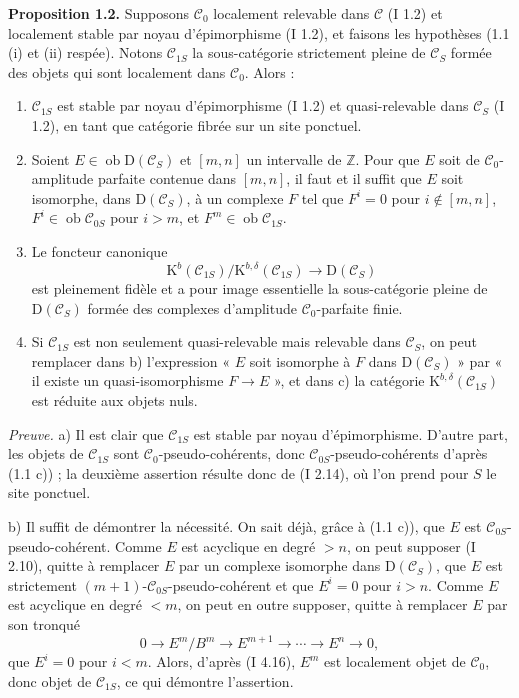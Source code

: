 \documentclass[11pt]{article}
\providecommand{\Ob}{\operatorname{ob}}
\begin{document}
\textbf{Proposition 1.2.} Supposons $\mathcal C_0$ localement relevable dans $\mathcal C$ (I 1.2) et localement stable par noyau d'épimorphisme (I 1.2), et faisons les hypothèses (1.1 (i) et (ii) respée). Notons $\mathcal C_{1S}$ la sous-catégorie strictement pleine de $\mathcal C_S$ formée des objets qui sont localement dans $\mathcal C_0$. Alors :
\begin{enumerate}[label=\alph*)]
\item $\mathcal C_{1S}$ est stable par noyau d'épimorphisme (I 1.2) et quasi-relevable dans $\mathcal C_S$ (I 1.2), en tant que catégorie fibrée sur un site ponctuel.
\item Soient $E\in\Ob\mathrm D(\mathcal C_S)$ et $[m,n]$ un intervalle de $\mathbb Z$. Pour que $E$ soit de $\mathcal C_0$-amplitude parfaite contenue dans $[m,n]$, il faut et il suffit que $E$ soit isomorphe, dans $\mathrm D(\mathcal C_S)$, à un complexe $F$ tel que $F^i=0$ pour $i\notin[m,n]$, $F^i\in\Ob\mathcal C_{0S}$ pour $i>m$, et $F^m\in\Ob\mathcal C_{1S}$.
\item Le foncteur canonique
\[
\mathrm K^b(\mathcal C_{1S})/\mathrm K^{b,\delta}(\mathcal C_{1S})
\longrightarrow \mathrm D(\mathcal C_S)
\]
est pleinement fidèle et a pour image essentielle la sous-catégorie pleine de $\mathrm D(\mathcal C_S)$ formée des complexes d'amplitude $\mathcal C_0$-parfaite finie.
\item Si $\mathcal C_{1S}$ est non seulement quasi-relevable mais relevable dans $\mathcal C_S$, on peut remplacer dans b) l'expression « $E$ soit isomorphe à $F$ dans $\mathrm D(\mathcal C_S)$ » par « il existe un quasi-isomorphisme $F\to E$ », et dans c) la catégorie $\mathrm K^{b,\delta}(\mathcal C_{1S})$ est réduite aux objets nuls.
\end{enumerate}

\emph{Preuve.} a) Il est clair que $\mathcal C_{1S}$ est stable par noyau d'épimorphisme. D'autre part, les objets de $\mathcal C_{1S}$ sont $\mathcal C_0$-pseudo-cohérents, donc $\mathcal C_{0S}$-pseudo-cohérents d'après (1.1 c)) ; la deuxième assertion résulte donc de (I 2.14), où l'on prend pour $S$ le site ponctuel.

b) Il suffit de démontrer la nécessité. On sait déjà, grâce à (1.1 c)), que $E$ est $\mathcal C_{0S}$-pseudo-cohérent. Comme $E$ est acyclique en degré $>n$, on peut supposer (I 2.10), quitte à remplacer $E$ par un complexe isomorphe dans $\mathrm D(\mathcal C_S)$, que $E$ est strictement $(m+1)$-$\mathcal C_{0S}$-pseudo-cohérent et que $E^i=0$ pour $i>n$. Comme $E$ est acyclique en degré $<m$, on peut en outre supposer, quitte à remplacer $E$ par son tronqué
\[
0\longrightarrow E^m/B^m\longrightarrow E^{m+1}\longrightarrow\cdots\longrightarrow E^n\longrightarrow0,
\]
que $E^i=0$ pour $i<m$. Alors, d'après (I 4.16), $E^m$ est localement objet de $\mathcal C_0$, donc objet de $\mathcal C_{1S}$, ce qui démontre l'assertion.
\end{document}
